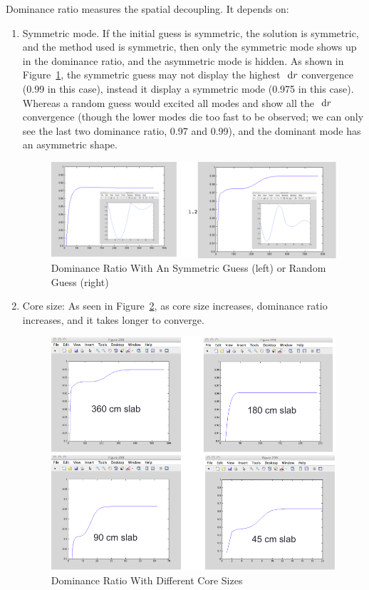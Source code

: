 \documentclass{school-22.211-notes}
\begin{document}
Dominance ratio measures the spatial decoupling. It depends on: 
\begin{enumerate}
\item Symmetric mode. If the initial guess is symmetric, the solution is symmetric, and the method used is symmetric, then only the symmetric mode shows up in the dominance ratio, and the asymmetric mode is hidden. As shown in Figure~\ref{dominance-symmetric}, the symmetric guess may not display the highest $\mbox{ }\mathrm{d} r$ convergence (0.99 in this case), instead it display a symmetric mode (0.975 in this case). Whereas a random guess would excited all modes and show all the $\mbox{ }\mathrm{d} r$ convergence (though the lower modes die too fast to be observed; we can only see the last two dominance ratio, 0.97 and 0.99), and the dominant mode has an asymmetric shape.  
\begin{figure}[ht]
  \centering
  \includegraphics[width=6in]{images/dfs/dominance_ratio.png}
  \caption{Dominance Ratio With An Symmetric Guess (left) or Random Guess (right)}
  \label{dominance-symmetric}
\end{figure}

\item Core size: As seen in Figure~\ref{dominance-size}, as core size increases, dominance ratio increases, and it takes longer to converge. 
\begin{figure}
  \centering
  \includegraphics[width=7in]{images/dfs/dominance_ratio_size.png}
  \caption{Dominance Ratio With Different Core Sizes}
  \label{dominance-size}
\end{figure}


\end{enumerate}
\end{document}
